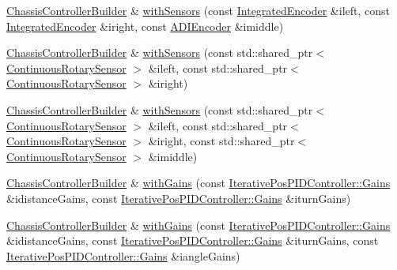 \begin{DoxyCompactItemize}
\mbox{\hyperlink{classokapi_1_1ChassisControllerBuilder}{Chassis\+Controller\+Builder}} \& \mbox{\hyperlink{classokapi_1_1ChassisControllerBuilder_a9ba0a2bf4c4d0334f96bd08b08144cc3}{with\+Sensors}} (const \mbox{\hyperlink{classokapi_1_1IntegratedEncoder}{Integrated\+Encoder}} \&ileft, const \mbox{\hyperlink{classokapi_1_1IntegratedEncoder}{Integrated\+Encoder}} \&iright, const \mbox{\hyperlink{classokapi_1_1ADIEncoder}{A\+D\+I\+Encoder}} \&imiddle)
\item 
\mbox{\hyperlink{classokapi_1_1ChassisControllerBuilder}{Chassis\+Controller\+Builder}} \& \mbox{\hyperlink{classokapi_1_1ChassisControllerBuilder_a10214db4bffeb20b0e7b3d5c956061fa}{with\+Sensors}} (const std\+::shared\+\_\+ptr$<$ \mbox{\hyperlink{classokapi_1_1ContinuousRotarySensor}{Continuous\+Rotary\+Sensor}} $>$ \&ileft, const std\+::shared\+\_\+ptr$<$ \mbox{\hyperlink{classokapi_1_1ContinuousRotarySensor}{Continuous\+Rotary\+Sensor}} $>$ \&iright)
\item 
\mbox{\hyperlink{classokapi_1_1ChassisControllerBuilder}{Chassis\+Controller\+Builder}} \& \mbox{\hyperlink{classokapi_1_1ChassisControllerBuilder_a2c2d1276f03425ecbe97b55ce8832d9e}{with\+Sensors}} (const std\+::shared\+\_\+ptr$<$ \mbox{\hyperlink{classokapi_1_1ContinuousRotarySensor}{Continuous\+Rotary\+Sensor}} $>$ \&ileft, const std\+::shared\+\_\+ptr$<$ \mbox{\hyperlink{classokapi_1_1ContinuousRotarySensor}{Continuous\+Rotary\+Sensor}} $>$ \&iright, const std\+::shared\+\_\+ptr$<$ \mbox{\hyperlink{classokapi_1_1ContinuousRotarySensor}{Continuous\+Rotary\+Sensor}} $>$ \&imiddle)
\item 
\mbox{\hyperlink{classokapi_1_1ChassisControllerBuilder}{Chassis\+Controller\+Builder}} \& \mbox{\hyperlink{classokapi_1_1ChassisControllerBuilder_ac7b348a81cda8897540db92f14d1d8e3}{with\+Gains}} (const \mbox{\hyperlink{structokapi_1_1IterativePosPIDController_1_1Gains}{Iterative\+Pos\+P\+I\+D\+Controller\+::\+Gains}} \&idistance\+Gains, const \mbox{\hyperlink{structokapi_1_1IterativePosPIDController_1_1Gains}{Iterative\+Pos\+P\+I\+D\+Controller\+::\+Gains}} \&iturn\+Gains)
\item 
\mbox{\hyperlink{classokapi_1_1ChassisControllerBuilder}{Chassis\+Controller\+Builder}} \& \mbox{\hyperlink{classokapi_1_1ChassisControllerBuilder_a4fa2d56589f5a4c8e69b36238bc3f4de}{with\+Gains}} (const \mbox{\hyperlink{structokapi_1_1IterativePosPIDController_1_1Gains}{Iterative\+Pos\+P\+I\+D\+Controller\+::\+Gains}} \&idistance\+Gains, const \mbox{\hyperlink{structokapi_1_1IterativePosPIDController_1_1Gains}{Iterative\+Pos\+P\+I\+D\+Controller\+::\+Gains}} \&iturn\+Gains, const \mbox{\hyperlink{structokapi_1_1IterativePosPIDController_1_1Gains}{Iterative\+Pos\+P\+I\+D\+Controller\+::\+Gains}} \&iangle\+Gains)

\end{DoxyCompactItemize}

